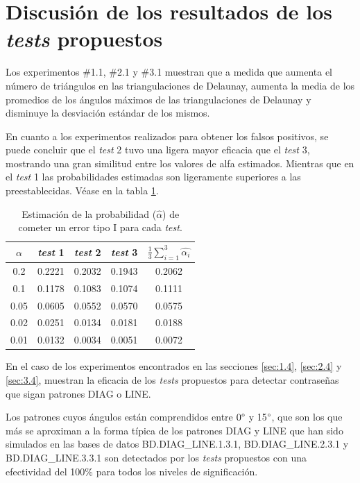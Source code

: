 \documentclass[12pt]{report}
\begin{document}
\section{Discusión de los resultados de los \textit{tests} propuestos}
Los experimentos \#1.1, \#2.1 y \#3.1 muestran que a medida que aumenta el número de triángulos en las triangulaciones de Delaunay, aumenta la media de los promedios de los ángulos máximos de las triangulaciones de Delaunay y disminuye la desviación estándar de los mismos. 

En cuanto a los experimentos realizados para obtener los falsos positivos, se puede concluir que el \textit{test} 2 tuvo una ligera mayor eficacia que el \textit{test} 3, mostrando una gran similitud entre los valores de alfa estimados. Mientras que en el \textit{test} 1 las probabilidades estimadas son ligeramente superiores a las preestablecidas. Véase en la tabla \ref{tab:error1}.
\begin{table}[h!]
	\centering
	\begin{tabular}{|c|ccc|c|}
		\hline
		$\alpha$& \textit{test} 1 & \textit{test} 2 & \textit{test} 3  & $\frac{1}{3} \sum_{i=1}^{3} \hat{\alpha_i}$  \\
		\hline
		0.2 &  0.2221    & 0.2032    &  0.1943 & 0.2062  \\
		0.1 &  0.1178    & 0.1083    &  0.1074 & 0.1111  \\
		0.05&  0.0605    & 0.0552    &  0.0570  & 0.0575  \\
		0.02&  0.0251    & 0.0134    &  0.0181 & 0.0188  \\
		0.01&  0.0132    & 0.0034    &  0.0051 & 0.0072  \\
		\hline
	\end{tabular}
	\caption{Estimación de la probabilidad ($\hat{\alpha}$) de cometer un error tipo I para cada \textit{test}.}
	\label{tab:error1}
\end{table}

En el caso de los experimentos encontrados en las secciones \ref{sec:1.4}, \ref{sec:2.4} y \ref{sec:3.4}, muestran la eficacia de los \textit{tests} propuestos  para detectar contraseñas que sigan patrones DIAG o LINE.

Los patrones cuyos ángulos están comprendidos entre $0\degree$ y 15$\degree$, que son los que más se aproximan a la forma típica de los patrones DIAG y LINE que han sido simulados en las bases de datos BD.DIAG\_LINE.1.3.1, BD.DIAG\_LINE.2.3.1 y BD.DIAG\_LINE.3.3.1 son detectados por los \textit{tests} propuestos con una efectividad del 100\% para todos los niveles de significación.
\end{document}
